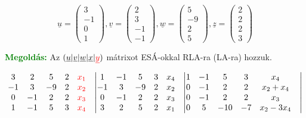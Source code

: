 \documentclass[../szamtud.tex]{subfiles}
\begin{document}
        \[
            \underline{u} = \begin{pmatrix}
                3 \\
                -1 \\
                0 \\ 
                1 
            \end{pmatrix}, \underline{v} = 
            \begin{pmatrix}
                2 \\
                3 \\
                -1 \\
                -1 
            \end{pmatrix}, \underline{w} = 
            \begin{pmatrix}
                5 \\
                -9 \\
                2 \\
                5
            \end{pmatrix}, \underline{z} = 
            \begin{pmatrix}
                2 \\
                2 \\
                2 \\
                3
            \end{pmatrix}
        \]

        \textcolor{green}{\textbf{Megoldás:}} Az $(\underline{u}|\underline{v}|\underline{w}|\underline{x}|\textcolor{red}{\underline{y}})$ mátrixot ESÁ-okkal RLA-ra (LA-ra) hozzuk.

        \[ 
            \begin{matrix}
                3 & 2 & 5 & 2 & \textcolor{red}{x_1} & \bigm| \\
                -1 & 3 & -9 & 2 & \textcolor{red}{x_2} & \bigm| \\
                0 & -1 & 2 & 2 & \textcolor{red}{x_3} & \bigm| \\
                1 & -1 & 5 & 3 & \textcolor{red}{x_4} & \bigm| 
            \end{matrix}  
            \begin{matrix}
                1 & -1 & 5 & 3 & x_4 & \bigm| \\
                -1 & 3 & -9 & 2 & x_2 & \bigm| \\
                0 & -1 & 2 & 2 & x_3 & \bigm| \\
                3 & 2 & 5 & 2 & x_1 & \bigm| 
            \end{matrix} 
            \begin{matrix}
                1 & -1 & 5 & 3 & x_4 & \bigm| \\
                0 & -1 & 2 & 2 & x_2+x_4 & \bigm| \\
                0 & -1 & 2 & 2 & x_3 & \bigm| \\
                0 & 5 & -10 & -7 & x_2-3x_4 & \bigm| 
            \end{matrix} 
        \]
\end{document}
